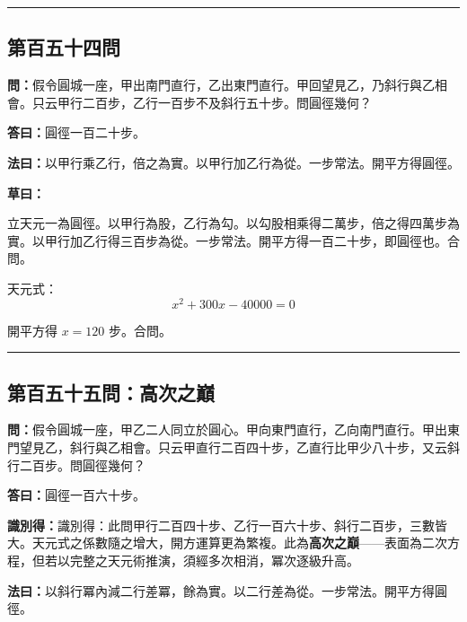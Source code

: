\documentclass[11pt,a4paper]{article}
\newcommand{\longline}{\noindent\rule{\textwidth}{0.4pt}}
\newcommand{\wen}[1]{\par\noindent\textbf{\textcolor{probcolor}{問：}}{#1}\par}
\newcommand{\da}[1]{\par\noindent\textbf{\textcolor{anscolor}{答曰：}}{#1}\par}
\newcommand{\fayue}[1]{\par\noindent\textbf{\textcolor{methodcolor}{法曰：}}{#1}\par}
\newcommand{\caoyue}[1]{\par\noindent\textbf{草曰：}{#1}\par}
\newcommand{\zhi}[1]{\par\noindent\textbf{識別得：}{#1}\par}
\begin{document}
\vspace{0.5cm}
\longline

\subsection*{第百五十四問}
\wen{假令圓城一座，甲出南門直行，乙出東門直行。甲回望見乙，乃斜行與乙相會。只云甲行二百步，乙行一百步不及斜行五十步。問圓徑幾何？}

\da{圓徑一百二十步。}

\fayue{以甲行乘乙行，倍之為實。以甲行加乙行為從。一步常法。開平方得圓徑。}

\caoyue{
立天元一為圓徑。以甲行為股，乙行為勾。以勾股相乘得二萬步，倍之得四萬步為實。以甲行加乙行得三百步為從。一步常法。開平方得一百二十步，即圓徑也。合問。

天元式：
$$x^2 + 300x - 40000 = 0$$

開平方得 $x = 120$ 步。合問。
}

\vspace{0.5cm}
\longline

\subsection*{第百五十五問：高次之巔}
\wen{假令圓城一座，甲乙二人同立於圓心。甲向東門直行，乙向南門直行。甲出東門望見乙，斜行與乙相會。只云甲直行二百四十步，乙直行比甲少八十步，又云斜行二百步。問圓徑幾何？}

\da{圓徑一百六十步。}

\zhi{識別得：此問甲行二百四十步、乙行一百六十步、斜行二百步，三數皆大。天元式之係數隨之增大，開方運算更為繁複。此為\textbf{高次之巔}——表面為二次方程，但若以完整之天元術推演，須經多次相消，冪次逐級升高。}

\fayue{以斜行冪內減二行差冪，餘為實。以二行差為從。一步常法。開平方得圓徑。}
\end{document}

